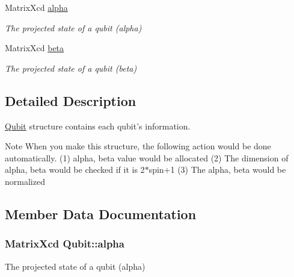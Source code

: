 \begin{DoxyCompactItemize}
Matrix\-Xcd \hyperlink{structQubit_accc3b309d802ab6f269b7d8a7536a4a0}{alpha}
\begin{DoxyCompactList}\small\item\em The projected state of a qubit (alpha) \end{DoxyCompactList}\item 
Matrix\-Xcd \hyperlink{structQubit_a6c73eb8c49fdb6db06179b21b5a2923d}{beta}
\begin{DoxyCompactList}\small\item\em The projected state of a qubit (beta) \end{DoxyCompactList}\end{DoxyCompactItemize}


\subsection{Detailed Description}
\hyperlink{structQubit}{Qubit} structure contains each qubit's information. 

\begin{DoxyNote}{Note}
When you make this structure, the following action would be done automatically. (1) alpha, beta value would be allocated (2) The dimension of alpha, beta would be checked if it is 2$\ast$spin+1 (3) The alpha, beta would be normalized 
\end{DoxyNote}


\subsection{Member Data Documentation}
\hypertarget{structQubit_accc3b309d802ab6f269b7d8a7536a4a0}{
\subsubsection[{alpha}]{\setlength{\rightskip}{0pt plus 5cm}Matrix\-Xcd Qubit\-::alpha}}\label{structQubit_accc3b309d802ab6f269b7d8a7536a4a0}


The projected state of a qubit (alpha) 

